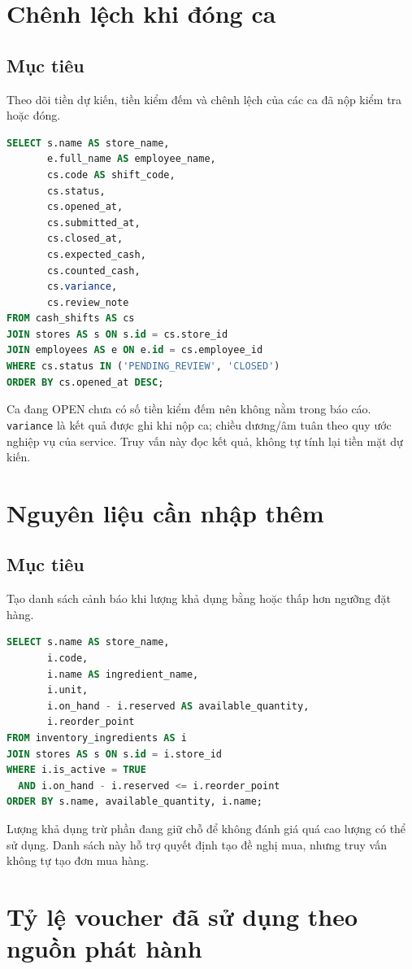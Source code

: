 \section{Chênh lệch khi đóng ca}
\subsection*{Mục tiêu}
Theo dõi tiền dự kiến, tiền kiểm đếm và chênh lệch của các ca đã nộp kiểm tra hoặc đóng.
\begin{lstlisting}[language=SQL]
SELECT s.name AS store_name,
       e.full_name AS employee_name,
       cs.code AS shift_code,
       cs.status,
       cs.opened_at,
       cs.submitted_at,
       cs.closed_at,
       cs.expected_cash,
       cs.counted_cash,
       cs.variance,
       cs.review_note
FROM cash_shifts AS cs
JOIN stores AS s ON s.id = cs.store_id
JOIN employees AS e ON e.id = cs.employee_id
WHERE cs.status IN ('PENDING_REVIEW', 'CLOSED')
ORDER BY cs.opened_at DESC;
\end{lstlisting}

Ca đang OPEN chưa có số tiền kiểm đếm nên không nằm trong báo cáo. \texttt{variance} là kết quả được ghi khi nộp ca; chiều dương/âm tuân theo quy ước nghiệp vụ của service. Truy vấn này đọc kết quả, không tự tính lại tiền mặt dự kiến.

\section{Nguyên liệu cần nhập thêm}
\subsection*{Mục tiêu}
Tạo danh sách cảnh báo khi lượng khả dụng bằng hoặc thấp hơn ngưỡng đặt hàng.
\begin{lstlisting}[language=SQL]
SELECT s.name AS store_name,
       i.code,
       i.name AS ingredient_name,
       i.unit,
       i.on_hand - i.reserved AS available_quantity,
       i.reorder_point
FROM inventory_ingredients AS i
JOIN stores AS s ON s.id = i.store_id
WHERE i.is_active = TRUE
  AND i.on_hand - i.reserved <= i.reorder_point
ORDER BY s.name, available_quantity, i.name;
\end{lstlisting}

Lượng khả dụng trừ phần đang giữ chỗ để không đánh giá quá cao lượng có thể sử dụng. Danh sách này hỗ trợ quyết định tạo đề nghị mua, nhưng truy vấn không tự tạo đơn mua hàng.

\section{Tỷ lệ voucher đã sử dụng theo nguồn phát hành}
